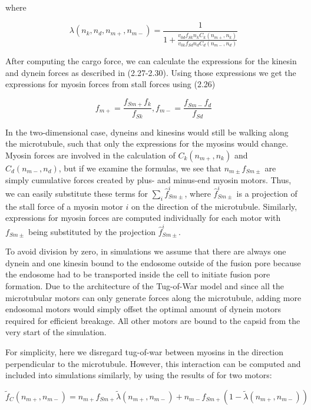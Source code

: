 where

\begin{equation}
\lambda(n_k, n_d, n_{m+}, n_{m-}) = \frac{1}{1 + \frac{v_{0d}f_{Sk}n_kC_k(n_{m+}, n_k)}{v_{0k}f_{Sd}n_dC_d(n_{m-},n_d)}}
\end{equation}

After computing the cargo force, we can calculate the expressions for the kinesin and dynein forces as described in (2.27-2.30). Using those expressions we get the expressions for myosin forces from stall forces using (2.26)

\begin{equation}
f_{m+} = \frac{f_{Sm+}f_k}{f_{Sk}}, 
f_{m-} =  \frac{f_{Sm-}f_d}{f_{Sd}}
\end{equation}

In the two-dimensional case, dyneins and kinesins would still be walking along the microtubule, such that only the expressions for the myosins would change. Myosin forces are involved in the calculation of $C_k(n_{m+}, n_k)$ and $C_d(n_{m-},n_d)$, but if we examine the formulas, we see that $n_{m\pm}f_{Sm\pm}$ are simply cumulative forces created by plus- and minus-end myosin motors. Thus, we can easily substitute these terms for $\sum_{i}\hat{f}^i_{Sm\pm}$, where $\hat{f}^i_{Sm\pm}$ is a projection of the stall force of a myosin motor $i$ on the direction of the microtubule. Similarly, expressions for myosin forces are computed individually for each motor with $f_{Sm\pm}$ being substituted by the projection $\hat{f}^i_{Sm\pm}$.

To avoid division by zero, in simulations we assume that there are always one dynein and one kinesin bound to the endosome outside of the fusion pore because the endosome had to be transported inside the cell to initiate fusion pore formation. Due to the architecture of the Tug-of-War model and since all the microtubular motors can only generate forces along the microtubule, adding more endosomal motors would simply offset the optimal amount of dynein motors required for efficient breakage. All other motors are bound to the capsid from the very start of the simulation.

For simplicity, here we disregard tug-of-war between myosins in the direction perpendicular to the microtubule. However, this interaction can be computed and included into simulations similarly, by using the results of \cite{gennerich2007force, muller2008tug, norstrom2010unconventional} for two motors:

\begin{equation}
\tilde{f}_C(n_{m+}, n_{m-}) = n_{m+}f_{Sm+}\tilde{\lambda}(n_{m+}, n_{m-}) + n_{m-}f_{Sm+}(1 - \tilde{\lambda}(n_{m+}, n_{m-}))
\end{equation}

